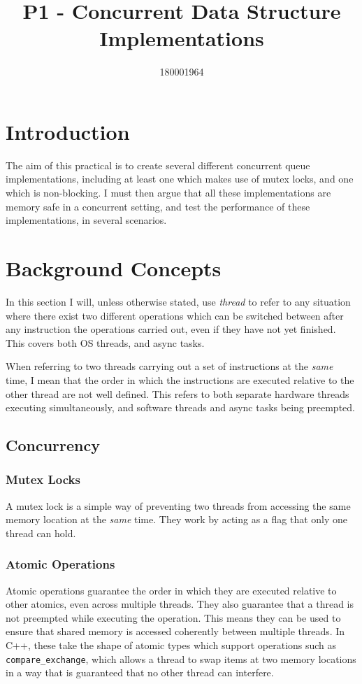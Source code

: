 \documentclass{article}
\title{P1 - Concurrent Data Structure Implementations}
\author{180001964}
\begin{document}
\maketitle

\section{Introduction}
The aim of this practical is to create several different concurrent queue
implementations, including at least one which makes use of mutex locks, and one
which is non-blocking. I must then argue that all these implementations are
memory safe in a concurrent setting, and test the performance of these
implementations, in several scenarios.

\section{Background Concepts}
In this section I will, unless otherwise stated, use \textit{thread} to refer to
any situation where there exist two different operations which can be switched
between after any instruction the operations carried out, even if they have not yet
finished. This covers both OS threads, and async tasks. 

When referring to two threads carrying out a set of instructions at the
\textit{same} time, I mean that the order in which the instructions are executed
relative to the other thread are not well defined. This refers to both separate
hardware threads executing simultaneously, and software threads and async tasks
being preempted.

\subsection{Concurrency}
\subsubsection{Mutex Locks}
A mutex lock is a simple way of preventing two threads from accessing the same
memory location at the \textit{same} time. They work by acting as a flag that
only one thread can hold. 

\subsubsection{Atomic Operations}
Atomic operations guarantee the order in which they are executed relative to
other atomics, even across multiple threads. They also guarantee that a thread
is not preempted while executing the operation. This means they can be used to
ensure that shared memory is accessed coherently between multiple threads. In
C++, these take the shape of atomic types which support operations such as
\verb|compare_exchange|, which allows a thread to swap items at two memory
locations in a way that is guaranteed that no other thread can interfere.
\end{document}
